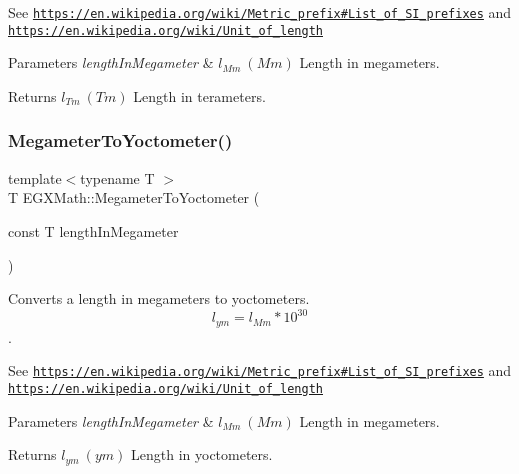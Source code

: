 See \href{https://en.wikipedia.org/wiki/Metric_prefix#List_of_SI_prefixes}{\tt https\+://en.\+wikipedia.\+org/wiki/\+Metric\+\_\+prefix\#\+List\+\_\+of\+\_\+\+S\+I\+\_\+prefixes} and \href{https://en.wikipedia.org/wiki/Unit_of_length}{\tt https\+://en.\+wikipedia.\+org/wiki/\+Unit\+\_\+of\+\_\+length} 
\begin{DoxyParams}{Parameters}
{\em length\+In\+Megameter} & $ l_{Mm}\ (Mm)$ Length in megameters. \\
\hline
\end{DoxyParams}
\begin{DoxyReturn}{Returns}
$ l_{Tm}\ (Tm)$ Length in terameters. 
\end{DoxyReturn}
\mbox{\label{group___e_g_x_math-_conversions-_length_conversions-_s_i-_megameter-_s_i_gac9b71989abb5a622818f01c5bdbe7285}} 
\subsubsection{\texorpdfstring{Megameter\+To\+Yoctometer()}{MegameterToYoctometer()}}
{\footnotesize\ttfamily template$<$typename T $>$ \\
T E\+G\+X\+Math\+::\+Megameter\+To\+Yoctometer (\begin{DoxyParamCaption}\item[{const T}]{length\+In\+Megameter }\end{DoxyParamCaption})}



Converts a length in megameters to yoctometers. \[ l_{ym}=l_{Mm} * 10^{30} \]. 

See \href{https://en.wikipedia.org/wiki/Metric_prefix#List_of_SI_prefixes}{\tt https\+://en.\+wikipedia.\+org/wiki/\+Metric\+\_\+prefix\#\+List\+\_\+of\+\_\+\+S\+I\+\_\+prefixes} and \href{https://en.wikipedia.org/wiki/Unit_of_length}{\tt https\+://en.\+wikipedia.\+org/wiki/\+Unit\+\_\+of\+\_\+length} 
\begin{DoxyParams}{Parameters}
{\em length\+In\+Megameter} & $ l_{Mm}\ (Mm)$ Length in megameters. \\
\hline
\end{DoxyParams}
\begin{DoxyReturn}{Returns}
$ l_{ym}\ (ym)$ Length in yoctometers. 
\end{DoxyReturn}
\mbox{\label{group___e_g_x_math-_conversions-_length_conversions-_s_i-_megameter-_s_i_ga3d729dabc7c37d927c02cf4ae0c560d4}} 
